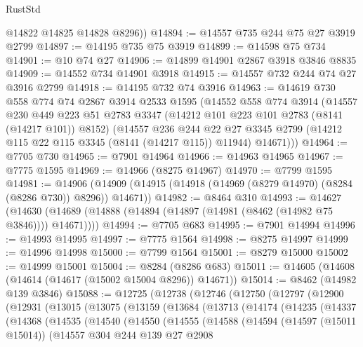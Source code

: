 \begin{lexlean}{RustStd}
\begin{coremodule}
        @14822
        @14825
        @14828
        @8296))
@14894 := @14557 @735 @244 @75 @27 @3919 @2799
@14897 := @14195 @735 @75 @3919
@14899 := @14598 @75 @734
@14901 := @10 @74 @27
@14906 := @14899 @14901 @2867 @3918 @3846 @8835
@14909 := @14552 @734 @14901 @3918
@14915 := @14557 @732 @244 @74 @27 @3916 @2799
@14918 := @14195 @732 @74 @3916
@14963 := @14619
    @730
    @558
    @774
    @74
    @2867
    @3914
    @2533
    @1595
    (@14552
      @558
      @774
      @3914
      (@14557
        @230
        @449
        @223
        @51
        @2783
        @3347
        (@14212 @101 @223 @101 @2783 (@8141 (@14217 @101)) @8152)
        (@14557
          @236
          @244
          @22
          @27
          @3345
          @2799
          (@14212 @115 @22 @115 @3345 (@8141 (@14217 @115)) @11944)
          @14671)))
@14964 := @7705 @730
@14965 := @7901 @14964
@14966 := @14963 @14965
@14967 := @7775 @1595
@14969 := @14966 (@8275 @14967)
@14970 := @7799 @1595
@14981 := @14906
    (@14909 (@14915 (@14918 (@14969 (@8279 @14970) (@8284 (@8286 @730)) @8296)) @14671))
@14982 := @8464 @310
@14993 := @14627
    (@14630 (@14689 (@14888 (@14894 (@14897 (@14981 (@8462 (@14982 @75 @3846)))) @14671))))
@14994 := @7705 @683
@14995 := @7901 @14994
@14996 := @14993 @14995
@14997 := @7775 @1564
@14998 := @8275 @14997
@14999 := @14996 @14998
@15000 := @7799 @1564
@15001 := @8279 @15000
@15002 := @14999 @15001
@15004 := @8284 (@8286 @683)
@15011 := @14605 (@14608 (@14614 (@14617 (@15002 @15004 @8296)) @14671))
@15014 := @8462 (@14982 @139 @3846)
@15088 := @12725
    (@12738
      (@12746
        (@12750
          (@12797
            (@12900
              (@12931
                (@13015
                  (@13075
                    (@13159
                      (@13684
                        (@13713
                          (@14174
                            (@14235
                              (@14337
                                (@14368
                                  (@14535
                                    (@14540
                                      (@14550
                                        (@14555
                                          (@14588
                                            (@14594
                                              (@14597 (@15011 @15014))
                                              (@14557
                                                @304
                                                @244
                                                @139
                                                @27
                                                @2908

\end{coremodule}
\end{lexlean}
